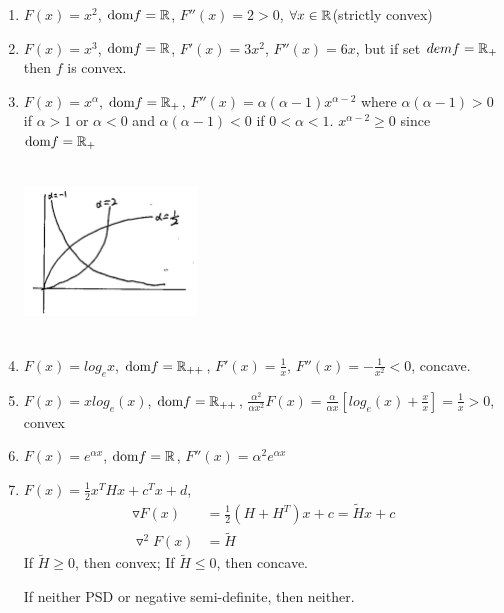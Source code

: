 \begin{enumerate}
	\item $F(x) = x^2$, $\text{dom}f = \mathbb{R}$, $F''(x) = 2 > 0$, $\forall x\in \mathbb{R}$(strictly convex)
	
	\item $F(x) = x^3$, $\text{dom}f = \mathbb{R}$, $F'(x) = 3x^2$, $F''(x) = 6x$, but if set $demf = \mathbb{R}_+$ then $f$ is convex.
	
	\item $F(x) = x^{\alpha}$, $\text{dom}f = \mathbb{R}_+$, $F''(x) = \alpha(\alpha - 1)x^{\alpha - 2}$ where $\alpha(\alpha - 1) > 0$ if $\alpha > 1$ or $\alpha < 0$ and $\alpha(\alpha - 1) < 0$ if $0<\alpha < 1$. $x^{\alpha - 2}\geq 0$ since $\text{dom}f = \mathbb{R}_+$
	
	\begin{marginfigure}
	\centering
	\includegraphics[width=1.8in,height=1.8in]{figures/ch08/figure1106_4.png}
	\end{marginfigure}
	
	\item $F(x) = log_ex$, $\text{dom}f = \mathbb{R}_{++}$, $F'(x) = \frac{1}{x}$, $F''(x) = -\frac{1}{x^2}<0$, concave.
	
	\item $F(x) = xlog_e(x)$, $\text{dom}f = \mathbb{R}_{++}$, $\frac{\alpha^2}{\alpha x^2}F(x) = \frac{\alpha}{\alpha x}[log_e(x) + \frac{x}{x}] = \frac{1}{x} > 0$, convex
	
	\item $F(x) = e^{\alpha x}$, $\text{dom}f = \mathbb{R}$, $F''(x) = \alpha^2 e^{\alpha x}$
	
	\item $F(x) = \frac{1}{2}x^THx + c^Tx + d$, 
	\begin{align*}
	\triangledown F(x) &= \frac{1}{2}(H+H^T)x + c = \tilde{H}x + c\\
	\triangledown^2F(x) &= \tilde{H}
	\end{align*}
	If $\tilde{H}\geq 0$, then convex; If $\tilde{H}\leq 0$, then concave.
	
	If neither PSD or negative semi-definite, then neither. 
\end{enumerate}


